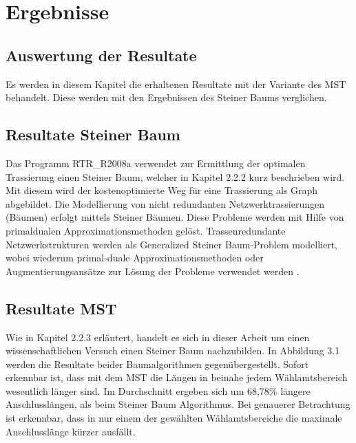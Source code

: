 \chapter{Ergebnisse}


\section{Auswertung der Resultate}
\label{sec:3ergebnisse}

Es werden in diesem Kapitel die erhaltenen Resultate mit der Variante des MST behandelt. Diese werden mit den Ergebnissen des Steiner Baums verglichen.


\vspace{1cm}

\section{Resultate Steiner Baum}
\label{sec:3 ergebnisse}

Das Programm RTR\_R2008a verwendet zur Ermittlung der optimalen Trassierung einen Steiner Baum, welcher in Kapitel 2.2.2 
kurz beschrieben wird.
Mit diesem wird der kostenoptimierte Weg für eine Trassierung als Graph abgebildet.
Die Modellierung von nicht redundanten Netzwerktrassierungen (Bäumen) erfolgt mittels Steiner Bäumen. Diese Probleme werden mit Hilfe von primaldualen
Approximationsmethoden gelöst.
Trassenredundante Netzwerkstrukturen werden als Generalized Steiner Baum-Problem modelliert, wobei wiederum primal-duale Approximationsmethoden
oder Augmentierungsansätze zur Lösung der Probleme verwendet werden \cite{tech_rep_1}.

\vspace{1cm}

\section{Resultate MST}
\label{sec:3 ergebnisse}

Wie in Kapitel 2.2.3 erläutert, handelt es sich in dieser Arbeit um einen wissenschaftlichen Versuch
einen Steiner Baum nachzubilden. In Abbildung 3.1 werden die Resultate beider Baumalgorithmen gegenübergestellt. 
Sofort erkennbar ist, dass mit dem MST die Längen in beinahe jedem Wählamtsbereich wesentlich länger sind. Im Durchschnitt ergeben sich um
68,78\% längere Anschlusslängen, als beim Steiner Baum Algorithmus.
Bei genauerer Betrachtung ist erkennbar, dass in nur einem der gewählten Wählamtsbereiche die maximale Anschlusslänge kürzer ausfällt.



